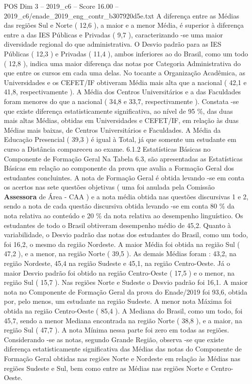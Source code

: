 \begin{textsample}{POS Dim 3 – 2019\_c6 – Score 16.00 – 2019\_c6/enade\_2019\_eng\_contr\_b307920d5e.txt}
A diferença entre as Médias das regiões Sul e Norte ( 12,6 ), a maior e a menor Média, é superior à diferença entre a das IES Públicas e Privadas ( 9,7 ), caracterizando -se uma maior diversidade regional do que administrativa.
O Desvio padrão para as IES Públicas ( 12,3 ) e Privadas ( 11,4 ), ambos inferiores ao do Brasil, como um todo ( 12,8 ), indica uma maior diferença das notas por Categoria Administrativa do que entre os cursos em cada uma delas.
No tocante a Organização Acadêmica, as Universidades e os CEFET/IF obtiveram Média mais alta que a nacional ( 42,1 e 41,8, respectivamente ).
A Média dos Centros Universitários e a das Faculdades foram menores do que a nacional ( 34,8 e 33,7, respectivamente ).
Constata -se que existe diferença estatisticamente significativa, ao nível de 95 \%, das duas mais altas Médias, obtidas em Universidades e CEFET/IF, em relação às duas Médias mais baixas, de Centros Universitários e Faculdades.
A Média da Educação Presencial ( 39,3 ) é igual à Total, já que somente um estudante em curso a Distância compareceu ao exame. 6.1.2 Estatísticas Básicas no Componente de Formação Geral Na Tabela 6.3, são apresentadas as Estatísticas Básicas em relação ao componente da prova que avalia a Formação Geral dos estudantes concluintes.
A nota de Formação Geral é obtida levando -se em conta os acertos nas sete questões objetivas ( uma foi anulada pela Comissão \textbf{Assessora} de Área - CAA ) e a nota média obtida nas questões discursivas 1 e 2, sendo a nota de cada questão discursiva obtida levando -se em conta 80 \% da nota relativa ao conteúdo e 20 \% da nota relativa ao desempenho linguístico.
Os estudantes de todo o Brasil obtiveram desempenho médio de 45,2.
Quanto à variabilidade, o Desvio padrão das notas dos estudantes do Brasil, como um todo, foi 16,2, o mesmo da região Nordeste.
A maior Média foi obtida na região Sul ( 47,2 ), e a menor, na região Norte ( 39,5 ).
As demais Médias foram : 43,2, na região Nordeste, 45,4 na região Sudeste e 45,1, na região Centro-Oeste.
Já o maior Desvio padrão foi obtido na região Centro-Oeste ( 17,5 ) e o menor, na região Sul ( 15,7 ).
Nas regiões Norte e Sudeste o Desvio padrão foi 16,1.
A maior nota no Componente de Formação Geral da prova do Enade/2019 foi 93,6, obtida por, pelo menos, um estudante na região Sudeste.
A menor nota Máxima foi obtida na região Centro-Oeste ( 85,4 ).
A Mediana do Brasil, como um todo, foi 45,7, sendo a menor Mediana encontrada na região Norte ( 38,8 ), e a maior, na região Sul ( 47,7 ).
A nota Mínima nessa parte foi zero em todas as regiões.
Considerando -se as notas, segundo Grande Região, observa -se que existe diferença estatisticamente significativa das Médias das notas do Componente de Formação Geral obtidas nas regiões Norte e Nordeste em relação às Médias nas regiões Sudeste e Sul, bem como entre as Médias nas regiões Norte e Centro-Oeste.

\end{textsample}
